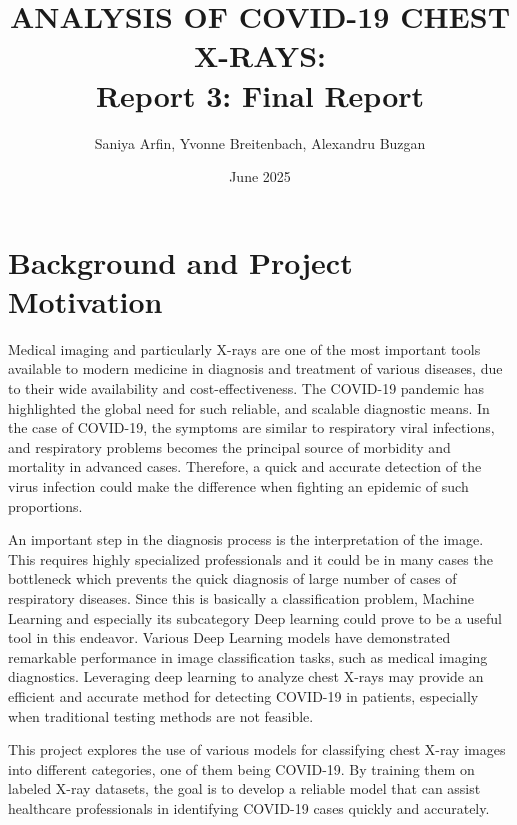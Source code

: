 \documentclass{article}
\title{ANALYSIS OF COVID-19 CHEST X-RAYS: \\Report 3: Final Report}
\author{Saniya Arfin, Yvonne Breitenbach, Alexandru Buzgan}
\date{June 2025}
\begin{document}
\maketitle

\tableofcontents

\newpage 

\section{Background and Project Motivation}
Medical imaging and particularly X-rays are one of the most important tools available to modern medicine in diagnosis and treatment of various diseases, due to their wide availability and cost-effectiveness. The COVID-19 pandemic has highlighted the global need for such reliable, and scalable diagnostic means. In the case of COVID-19, the symptoms are similar to respiratory viral infections, and respiratory problems becomes the principal source of morbidity and mortality in advanced cases. Therefore, a quick and accurate detection of the virus infection could make the difference when fighting an epidemic of such proportions.

An important step in the diagnosis process is the interpretation of the image. This requires highly specialized professionals and it could be in many cases the bottleneck which prevents the quick diagnosis of large number of cases of respiratory diseases. Since this is basically a classification problem, Machine Learning and especially its subcategory Deep learning could prove to be a useful tool in this endeavor. Various Deep Learning models have demonstrated remarkable performance in image classification tasks, such as medical imaging diagnostics. Leveraging deep learning to analyze chest X-rays may provide an efficient and accurate method for detecting COVID-19 in patients, especially when traditional testing methods are not feasible.

This project explores the use of various models for classifying chest X-ray images into different categories, one of them being COVID-19. By training them on labeled X-ray datasets, the goal is to develop a reliable model that can assist healthcare professionals in identifying COVID-19 cases quickly and accurately.
\end{document}
